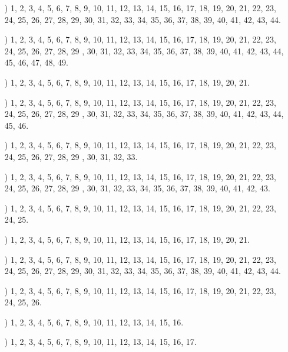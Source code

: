 \documentclass[a4paper,11pt]{article}
\numberwithin{equation}{section}
\begin{document}
\begin{itemize}
\item[\romannumeral1)] 1, 2, 3, 4, 5, 6, 7, 8, 9, 10, 11, 12, 13, 14, 15,
  16, 17, 18, 19, 20, 21, 22, 23, 24, 25, 26, 27, 28, 29, 30, 31, 32, 33,
  34, 35, 36, 37, 38, 39, 40, 41, 42, 43, 44.

\item[\romannumeral2)] 1, 2, 3, 4, 5, 6, 7, 8, 9, 10, 11, 12, 13, 14, 15,
  16, 17, 18, 19, 20, 21, 22, 23, 24, 25, 26, 27, 28, 29 , 30, 31, 32, 33,
  34, 35, 36, 37, 38, 39, 40, 41, 42, 43, 44, 45, 46, 47, 48, 49.

\item[\romannumeral3)] 1, 2, 3, 4, 5, 6, 7, 8, 9, 10, 11, 12, 13, 14, 15,
  16, 17, 18, 19, 20, 21.

\item[\romannumeral4)] 1, 2, 3, 4, 5, 6, 7, 8, 9, 10, 11, 12, 13, 14, 15,
  16, 17, 18, 19, 20, 21, 22, 23, 24, 25, 26, 27, 28, 29 , 30, 31, 32, 33,
  34, 35, 36, 37, 38, 39, 40, 41, 42, 43, 44, 45, 46.

\item[\romannumeral5)] 1, 2, 3, 4, 5, 6, 7, 8, 9, 10, 11, 12, 13, 14, 15,
  16, 17, 18, 19, 20, 21, 22, 23, 24, 25, 26, 27, 28, 29 , 30, 31, 32, 33.

\item[\romannumeral6)] 1, 2, 3, 4, 5, 6, 7, 8, 9, 10, 11, 12, 13, 14, 15,
  16, 17, 18, 19, 20, 21, 22, 23, 24, 25, 26, 27, 28, 29 , 30, 31, 32, 33,
  34, 35, 36, 37, 38, 39, 40, 41, 42, 43.

\item[\romannumeral7)] 1, 2, 3, 4, 5, 6, 7, 8, 9, 10, 11, 12, 13, 14, 15,
  16, 17, 18, 19, 20, 21, 22, 23, 24, 25.

\item[\romannumeral8)] 1, 2, 3, 4, 5, 6, 7, 8, 9, 10, 11, 12, 13, 14, 15,
  16, 17, 18, 19, 20, 21.

\item[\romannumeral9)] 1, 2, 3, 4, 5, 6, 7, 8, 9, 10, 11, 12, 13, 14, 15,
  16, 17, 18, 19, 20, 21, 22, 23, 24, 25, 26, 27, 28, 29, 30, 31, 32, 33,
  34, 35, 36, 37, 38, 39, 40, 41, 42, 43, 44.

\item[\romannumeral10)] 1, 2, 3, 4, 5, 6, 7, 8, 9, 10, 11, 12, 13, 14, 15,
  16, 17, 18, 19, 20, 21, 22, 23, 24, 25, 26.

\item[\romannumeral11)] 1, 2, 3, 4, 5, 6, 7, 8, 9, 10, 11, 12, 13, 14, 15,
  16.

\item[\romannumeral12)] 1, 2, 3, 4, 5, 6, 7, 8, 9, 10, 11, 12, 13, 14, 15,
  16, 17.

\end{itemize}
\end{document}
